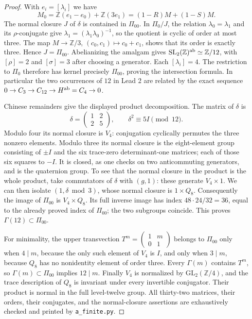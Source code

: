 \begin{proof}
With $e_i=[\lambda_i]$ we have
\[
 M_0=\mathbb Z(e_1-e_0)+\mathbb Z(3e_1)
     =(1-R)M+(1-S)M.
\]
The normal closure $J$ of $\delta$ is contained in $\Pi_{00}$.
In $\Pi_0/J$, the relation $\lambda_0=\lambda_1$ and its $\rho$-conjugate
give $\lambda_1=(\lambda_1\lambda_0)^{-1}$, so the quotient is cyclic
of order at most three. The map $M\to\mathbb Z/3$, $(c_0,c_1)\mapsto
c_0+c_1$, shows that its order is exactly three. Hence $J=\Pi_{00}$.
Abelianizing the amalgam gives $\mathrm{SL}_2(\mathbb Z)^{\rm ab}
\simeq\mathbb Z/12$, with $[\rho]=2$ and $[\sigma]=3$ after choosing
a generator. Each $[\lambda_i]=4$. The restriction to $\Pi_0$ therefore
has kernel precisely $\Pi_{00}$, proving the intersection formula.
In particular the two occurrences of $12$ in Lead 2 are related by the
exact sequence $0\to C_3\to C_{12}\to H^{\rm ab}=C_4\to0$.

Chinese remainders give the displayed product decomposition. The
matrix of $\delta$ is
\[
 \delta=\begin{pmatrix}1&2\\2&5\end{pmatrix},\qquad
 \delta^2\equiv5I\pmod{12}.
\]
Modulo four its normal closure is $V_4$: conjugation cyclically
permutes the three nonzero elements. Modulo three its normal closure
is the eight-element group consisting of $\pm I$ and the six
trace-zero determinant-one matrices; each of those six squares to
$-I$. It is closed, as one checks on two anticommuting generators,
and is the quaternion group. To see that the normal closure in the
product is the whole product, take commutators of $\delta$ with
$(g,1)$: these generate $V_4\times1$. We can then isolate
$(1,\delta\bmod3)$, whose normal closure is $1\times Q_8$.
Consequently the image of $\Pi_{00}$ is $V_4\times Q_8$.
Its full inverse image has index
$48\cdot24/32=36$, equal to the already proved index of $\Pi_{00}$;
the two subgroups coincide. This proves $\Gamma(12)\subset\Pi_{00}$.

For minimality, the upper transvection
$T^m=\left(\begin{smallmatrix}1&m\\0&1\end{smallmatrix}\right)$
belongs to $\Pi_{00}$ only when $4\mid m$, because the only such
element of $V_4$ is $I$, and only when $3\mid m$, because $Q_8$ has
no nonidentity element of order three. Every $\Gamma(m)$ contains
$T^m$, so $\Gamma(m)\subset\Pi_{00}$ implies $12\mid m$.
Finally $V_4$ is normalized by $\mathrm{GL}_2(\mathbb Z/4)$, and the
trace description of $Q_8$ is invariant under every invertible
conjugator. Their product is normal in the full level-twelve group.
All thirty-two matrices, their orders, their conjugates, and the
normal-closure assertions are exhaustively checked and printed by
\texttt{a\_finite.py}.
\end{proof}

